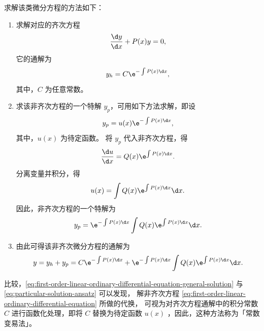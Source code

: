 求解该类微分方程的方法如下：
\begin{enumerate}
    \item 求解对应的齐次方程
          \begin{equation*}
              \frac{\d y}{\d x} + P(x) y = 0 ,
          \end{equation*}
          它的通解为
          \begin{equation}
              y_h = C \e^{-\int P(x) \d x} \label{eq:first-order-linear-ordinary-differential-equation-general-solution},
          \end{equation}
          其中，$ C $ 为任意常数。
    \item 求该非齐次方程的一个特解 $ y_p $，可用如下方法求解，即设
          \begin{equation}
              y_p = u(x) \e^{-\int P(x) \d x} \label{eq:particular-solution-ansatz},
          \end{equation}
          其中，$ u(x) $ 为待定函数。
          将 $ y_p $ 代入非齐次方程，得
          \begin{equation*}
              \frac{\d u}{\d x} = Q(x) \e^{\int P(x) \d x} .
          \end{equation*}
          分离变量并积分，得
          \begin{equation*}
              u(x) = \int Q(x) \e^{\int P(x) \d x} \d x .
          \end{equation*}
          因此，非齐次方程的一个特解为
          \begin{equation}
              y_p = \e^{-\int P(x) \d x} \int Q(x) \e^{\int P(x) \d x} \d x .
          \end{equation}
    \item 由此可得该非齐次微分方程的通解为
          \begin{equation}
              y = y_h + y_p = C \e^{-\int P(x) \d x} + \e^{-\int P(x) \d x} \int Q(x) \e^{\int P(x) \d x} \d x \label{eq:first-order-linear-ordinary-differential-equation-general-solution-nonhomogeneous}.
          \end{equation}
\end{enumerate}

比较，\cref{eq:first-order-linear-ordinary-differential-equation-general-solution} 与 \cref{eq:particular-solution-ansatz} 可以发现，
解非齐次方程 \cref{eq:first-order-linear-ordinary-differential-equation} 所做的代换，
可视为对齐次方程通解中的积分常数 $ C $ 进行函数化处理，即将 $ C $ 替换为待定函数 $ u(x) $ ，因此，这种方法称为「常数变易法」。

